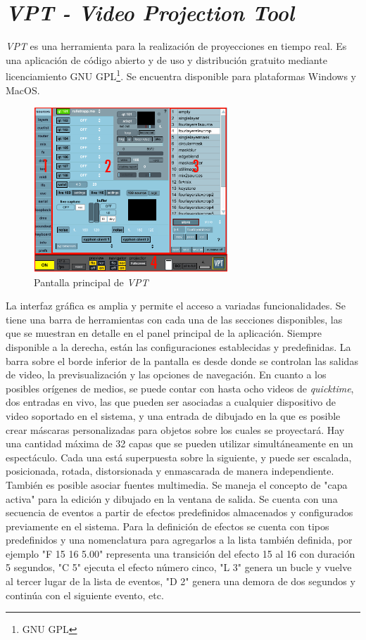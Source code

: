 \section{\emph{VPT - Video Projection Tool}}
\emph{VPT}\cite{VPT} es una herramienta para la realización de proyecciones en tiempo real. Es una aplicación de código abierto y de uso y distribución gratuito mediante licenciamiento GNU GPL\footnote{GNU GPL}. Se encuentra disponible para plataformas Windows y MacOS.

\begin{figure}[H]
  \centering
    \includegraphics[width=0.65\textwidth]{./Cap3_aplicaciones/apps-vpt.png}
  \caption{Pantalla principal de \emph{VPT}}
  \label{fig:Apps-VPT}
\end{figure}

La interfaz gráfica es amplia y permite el acceso a variadas funcionalidades. Se tiene una barra de herramientas con cada una de las secciones disponibles, las que se muestran en detalle en el panel principal de la aplicación. Siempre disponible a la derecha, están las configuraciones establecidas y predefinidas. La barra sobre el borde inferior de la pantalla es desde donde se controlan las salidas de video, la previsualización y las opciones de navegación.
En cuanto a los posibles orígenes de medios, se puede contar con hasta ocho videos de \emph{quicktime}, dos entradas en vivo, las que pueden ser asociadas a cualquier dispositivo de video soportado en el sistema, y una entrada de dibujado en la que es posible crear máscaras personalizadas para objetos sobre los cuales se proyectará.
Hay una cantidad máxima de 32 capas que se pueden utilizar simultáneamente en un espectáculo. Cada una está superpuesta sobre la siguiente, y puede ser escalada, posicionada, rotada, distorsionada y enmascarada de manera independiente. También es posible asociar fuentes multimedia. Se maneja el concepto de "capa activa" para la edición y dibujado en la ventana de salida.
Se cuenta con una secuencia de eventos a partir de efectos predefinidos almacenados y configurados previamente en el sistema. Para la definición de efectos se cuenta con tipos predefinidos y una nomenclatura para agregarlos a la lista también definida, por ejemplo "F 15 16 5.00" representa una transición del efecto 15 al 16 con duración 5 segundos, "C 5" ejecuta el efecto número cinco, "L 3" genera un bucle y vuelve al tercer lugar de la lista de eventos, "D 2" genera una demora de dos segundos y continúa con el siguiente evento, etc.

